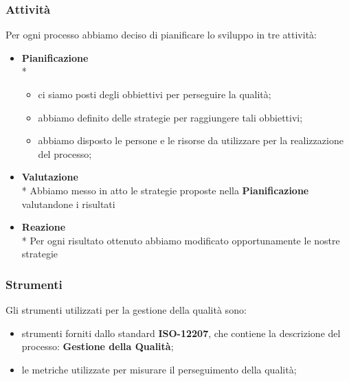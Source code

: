 \subsubsection{Attività}
Per ogni processo abbiamo deciso di pianificare lo sviluppo in tre attività:
\begin{itemize}
	\item \textbf{Pianificazione} \\*
		\begin{itemize}
			\item ci siamo posti degli obbiettivi per perseguire la qualità;
			\item abbiamo definito delle strategie per raggiungere tali obbiettivi;
			\item abbiamo disposto le persone e le risorse da utilizzare per la realizzazione del processo;
		\end{itemize}
	\item \textbf{Valutazione} \\*
		Abbiamo messo in atto le strategie proposte nella \textbf{Pianificazione} valutandone i risultati
	\item \textbf{Reazione} \\*
		Per ogni risultato ottenuto abbiamo modificato opportunamente le nostre strategie
\end{itemize}
\subsubsection{Strumenti}
Gli strumenti utilizzati per la gestione della qualità sono:
\begin{itemize}
	\item strumenti forniti dallo standard \textbf{ISO-12207}, che contiene la descrizione del processo: \textbf{Gestione della Qualità};
	\item le metriche utilizzate per misurare il perseguimento della qualità;
\end{itemize}
